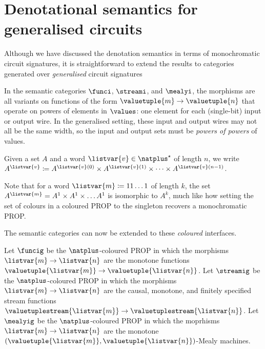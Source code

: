 \section{Denotational semantics for generalised circuits}

Although we have discussed the denotation semantics in terms of monochromatic
circuit signatures, it is straightforward to extend the results to categories
generated over \emph{generalised} circuit signatures

In the semantic categories \(\funci\), \(\streami\), and \(\mealyi\), the
morphisms are all variants on functions of the form
\(\valuetuple{m} \to \valuetuple{n}\) that operate on powers of elements in
\(\values\): one element for each (single-bit) input or output wire.
In the generalised setting, these input and output wires may not all be the
same width, so the input and output sets must be \emph{powers of powers} of
values.

\begin{notation}
    Given a set \(A\) and a word \(\listvar{v} \in \natplus^\star\) of
    length \(n\), we write \(
    A^{\listvar{v}}
    \coloneqq
    A^{\listvar{v}(0)}
    \times
    A^{\listvar{v}(1)}
    \times
    \dots
    \times
    A^{\listvar{v}(n-1)}
    \).
\end{notation}

Note that for a word \(\listvar{m} \coloneqq 11\dots1\) of length \(k\), the set
\(A^{\listvar{m}} = A^1 \times A^1 \times \dots A^1\) is isomorphic to \(A^k\),
much like how setting the set of colours in a coloured PROP to the singleton
recovers a monochromatic PROP.

The semantic categories can now be extended to these \emph{coloured} interfaces.

\begin{definition}
    Let \(\funcig\) be the \(\natplus\)-coloured PROP in which the morphisms
    \(\listvar{m} \to \listvar{n}\) are the monotone functions
    \(\valuetuple{\listvar{m}} \to \valuetuple{\listvar{n}}\).
    Let \(\streamig\) be the \(\natplus\)-coloured PROP in which the morphisms
    \(\listvar{m} \to \listvar{n}\) are the causal, monotone, and finitely
    specified stream functions \(
    \valuetuplestream{\listvar{m}} \to \valuetuplestream{\listvar{n}}
    \).
    Let \(\mealyig\) be the \(\natplus\)-coloured PROP in which the moprhisms
    \(\listvar{m} \to \listvar{n}\) are the monotone
    \((\valuetuple{\listvar{m}}, \valuetuple{\listvar{n}})\)-Mealy machines.
\end{definition}

